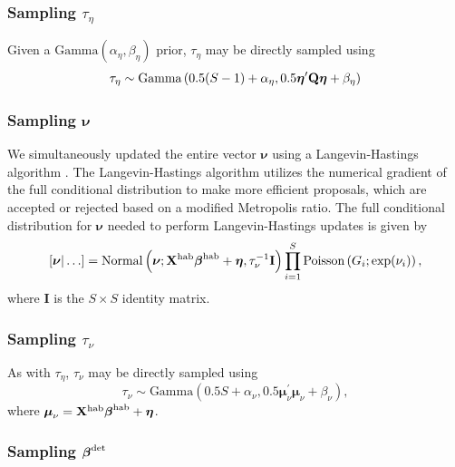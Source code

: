 \documentclass[10pt]{article}
\begin{document}
\subsubsection*{Sampling $\tau_\eta$}
Given a $\textrm{Gamma}(\alpha_\eta,\beta_\eta)$ prior, $\tau_\eta$ may be directly sampled using
$$
\tau_\eta \sim \textrm{Gamma}\left( 0.5(S-1)+\alpha_\eta,0.5\boldsymbol{\eta}^\prime {\bf Q} \boldsymbol{\eta}+\beta_\eta \right)
$$

\subsubsection*{Sampling $\boldsymbol{\nu}$}
We simultaneously updated the entire vector $\boldsymbol{\nu}$ using a Langevin-Hastings algorithm \cite{RobertCasella2004}.  The Langevin-Hastings algorithm utilizes the numerical gradient of the full conditional distribution to make more efficient proposals, which are accepted or rejected based on a modified Metropolis ratio.  The full conditional distribution for $\boldsymbol{\nu}$ needed to perform Langevin-Hastings updates is given by
$$
\left[ \boldsymbol{\nu} | \hdots \right] = \textrm{Normal}\left(\boldsymbol{\nu};{\bf X}^{\rm hab}\boldsymbol{\beta}^{\rm hab}+\boldsymbol{\eta},\tau_\nu^{-1} {\bf I} \right) \prod_{i=1}^S \textrm{Poisson} \left( G_i; \exp(\nu_i) \right),
$$
where {\bf I} is the $S\times S$ identity matrix.

\subsubsection*{Sampling $\tau_\nu$}
As with $\tau_\eta$, $\tau_\nu$ may be directly sampled using
$$
\tau_\nu \sim \textrm{Gamma}\left( 0.5S+\alpha_\nu,0.5\boldsymbol{\mu}_\nu^\prime \boldsymbol{\mu}_\nu+\beta_\nu \right),
$$
where $\boldsymbol{\mu}_\nu={\bf X}^{\rm hab}\boldsymbol{\beta}^{\rm hab}+\boldsymbol{\eta}$.

\subsubsection*{Sampling $\boldsymbol{\beta}^{\rm det}$}
\end{document}
